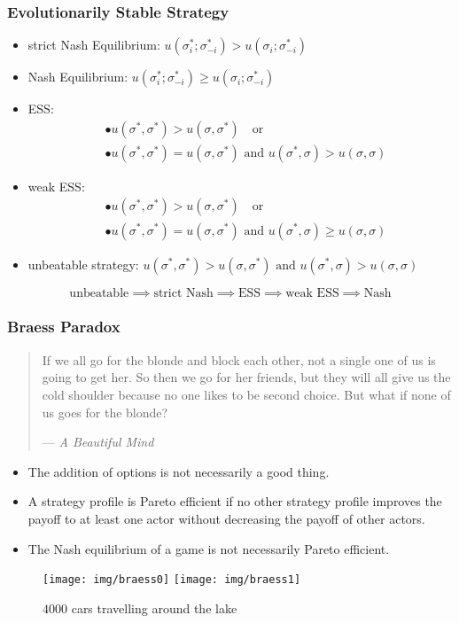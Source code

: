 \documentclass[UTF8,aspectratio=43,11pt,colorlinks,compress,openany]{beamer}%
\begin{document}
\begin{frame}\frametitle{Evolutionarily Stable Strategy}
\begin{itemize}
	\item strict Nash Equilibrium: $u(\sigma_i^*;\sigma_{-i}^*)>u(\sigma_i;\sigma_{-i}^*)$
	\item Nash Equilibrium: $u(\sigma_i^*;\sigma_{-i}^*)\geq u(\sigma_i;\sigma_{-i}^*)$
	\item ESS:
	\begin{align*}
	&\bullet u\left(\sigma^*,\sigma^*\right)>u\left(\sigma,\sigma^*\right)\quad\mbox{or}\\
	&\bullet u\left(\sigma^*,\sigma^*\right)=u\left(\sigma,\sigma^*\right)\mbox{ and } u\left(\sigma^*,\sigma\right)>u\left(\sigma,\sigma\right)
	\end{align*}
	\item weak ESS:
	\begin{align*}
	&\bullet u\left(\sigma^*,\sigma^*\right)>u\left(\sigma,\sigma^*\right)\quad\mbox{or}\\
	&\bullet u\left(\sigma^*,\sigma^*\right)=u\left(\sigma,\sigma^*\right)\mbox{ and } u\left(\sigma^*,\sigma\right)\geq u\left(\sigma,\sigma\right)
	\end{align*}
	\item unbeatable strategy:
	$u\left(\sigma^*,\sigma^*\right)>u\left(\sigma,\sigma^*\right)\mbox{ and } u\left(\sigma^*,\sigma\right)>u\left(\sigma,\sigma\right)$
\end{itemize}
\[\mbox{unbeatable}\implies\mbox{strict Nash}\implies\mbox{ESS}\implies\mbox{weak ESS}\implies\mbox{Nash}\]
\end{frame}

\begin{frame}\frametitle{Braess Paradox}
\begin{quote}
If we all go for the blonde and block each other, not a single one of us is going to get her. So then we go for her friends, but they will all give us the cold shoulder because no one likes to be second choice. But what if none of us goes for the blonde?\par\hfill --- \textsl{A Beautiful Mind}
\end{quote}\vspace{-4pt}
\begin{itemize}
	\item The addition of options is not necessarily a good thing.
	\item A strategy profile is Pareto efficient if no other strategy profile improves the payoff to at least one actor without decreasing the payoff of other actors.
	\item The Nash equilibrium of a game is not necessarily Pareto efficient.
\end{itemize}
\begin{figure}
	\texttt{[image: img/braess0]}
	\texttt{[image: img/braess1]}\vspace{-9pt}\caption{$4000$ cars travelling around the lake}
\end{figure}
\end{frame}
\end{document}
